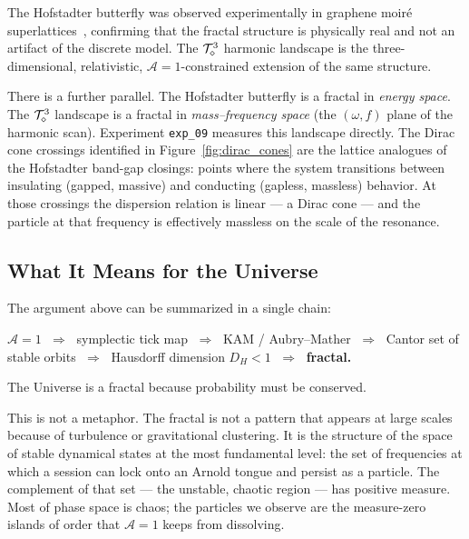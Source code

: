 The Hofstadter butterfly was observed experimentally in graphene
moir\'e superlattices~\cite{dean2013}, confirming that the fractal
structure is physically real and not an artifact of the discrete model.
The $\mathcal{T}_\diamond^3$ harmonic landscape is the three-dimensional, relativistic,
$\mathcal{A}=1$-constrained extension of the same structure.

There is a further parallel.
The Hofstadter butterfly is a fractal in \emph{energy space}.
The $\mathcal{T}_\diamond^3$ landscape is a fractal in \emph{mass--frequency space}
(the $(\omega, f)$ plane of the harmonic scan).
Experiment \texttt{exp\_09} measures this landscape directly.
The Dirac cone crossings identified in Figure~\ref{fig:dirac_cones}
are the lattice analogues of the Hofstadter band-gap closings:
points where the system transitions between insulating (gapped, massive)
and conducting (gapless, massless) behavior.
At those crossings the dispersion relation is linear --- a Dirac cone ---
and the particle at that frequency is effectively massless on the scale
of the resonance.

\subsection{What It Means for the Universe}
\label{subsec:fractal_meaning}

The argument above can be summarized in a single chain:

\begin{center}
$\mathcal{A}=1$
$\;\Longrightarrow\;$ symplectic tick map
$\;\Longrightarrow\;$ KAM / Aubry--Mather
$\;\Longrightarrow\;$ Cantor set of stable orbits
$\;\Longrightarrow\;$ Hausdorff dimension $D_H < 1$
$\;\Longrightarrow\;$ \textbf{fractal.}
\end{center}

The Universe is a fractal because probability must be conserved.

This is not a metaphor.
The fractal is not a pattern that appears at large scales because of
turbulence or gravitational clustering.
It is the structure of the space of stable dynamical states at the
most fundamental level: the set of frequencies at which a session can
lock onto an Arnold tongue and persist as a particle.
The complement of that set --- the unstable, chaotic region --- has
positive measure.
Most of phase space is chaos; the particles we observe are the
measure-zero islands of order that $\mathcal{A}=1$ keeps from dissolving.

